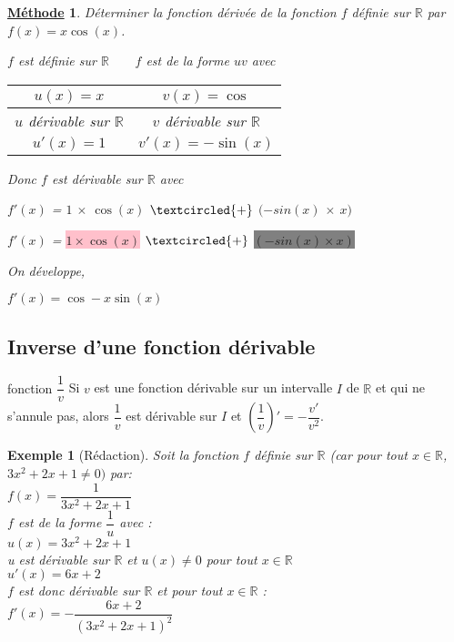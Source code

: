 \documentclass[11pt,a4paper]{article}
\def\R{{\mathbb R}}
\renewcommand{\arraystretch}{}
\theoremstyle{break}
\newtheorem{Ex}{Exemple}
\newtheorem{Meth}{\underline{Méthode}}
\begin{document}
\begin{Meth}
	Déterminer la fonction dérivée de la fonction $f$ définie sur $\R$ par $f(x)=x \cos(x)$.


\begin{multicols}{2}
	$f$ est définie sur $\R$~~~~$f$ est de la forme $uv$ avec 
\centering
\setlength{\arrayrulewidth}{2pt}
\renewcommand{\arraystretch}{2}
    \begin{tabular}{|C{2.5}|C{2.5}|}
    \hline
      $u(x) = x $ & $v(x) = \cos$ \\ 
	\hline
	$u$ dérivable sur $\R$ & $v$ dérivable sur $\R$\\
    \hline
     $u'(x)=1$&$v'(x)=-\sin(x)$  \\
    \hline
    \end{tabular}

	Donc $f$ est dérivable sur $\R$ avec \par
	$f'(x)$ = \colorbox{pink!200}{$1$} \textcircled{$\times$} \colorbox{pink!70}{$\cos(x)$} $\textcircled{+}$ \colorbox{gris2}{$(-sin(x)$} \textcircled{$\times$} \colorbox{gris1}{$x)$}\par
	$f'(x)$ = \colorbox{pink}{$1\times\cos(x)$} $\textcircled{+}$ \colorbox{gray}{$(-sin(x)\times x)$}\par
	On développe, \par
	$f'(x) = \cos - x \sin(x)$

\end{multicols}
\end{Meth}

\subsection{Inverse d'une fonction dérivable}

	\begin{bclogo}[couleur = yellow!30, arrondi = 0.1,logo=\bcbook]{fonction $\dfrac{1}{v}$}
	Si $v$ est une fonction dérivable sur un intervalle $I$ de $\R$ et qui ne s'annule pas, alors $\dfrac{1}{v}$ est dérivable sur $I$ et $\left(\dfrac{1}{v}\right)' =-\dfrac{v'}{v^2}$.
	\end{bclogo}
\begin{Ex}[Rédaction]
	Soit la fonction $f$ définie sur $\R$ (car pour tout $x\in \R$, $3x^2+2x+1\neq0 )$ par:\\
$ f(x) =\dfrac{1}{3x^2+2x+1}$\\
$f$ est de la forme $\dfrac{1}{u}$
avec :\\
$u(x) = 3x^2 + 2x + 1$\\
u est dérivable sur $\R$ et $u(x)\neq 0$ pour tout $x\in\R$\\
$u'(x) = 6x + 2$\\
$f$ est donc dérivable sur $\R$ et pour tout $x\in \R$ :\\
$f'(x) = -\dfrac{6x + 2}{(3x^2 + 2x + 1)^2}$\\
\end{Ex}
\newpage
\end{document}
